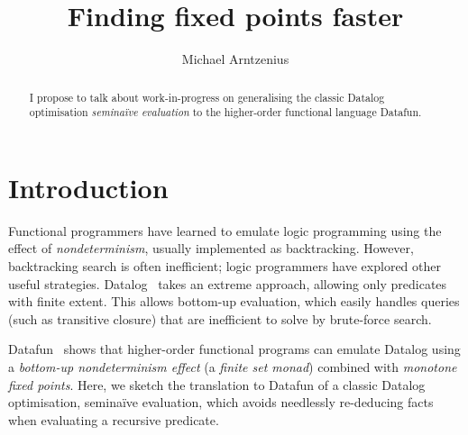 \documentclass[sigplan,screen,review,timestamp,dvipsnames]{acmart}
\title{Finding fixed points faster}
\author{Michael Arntzenius}
\affiliation{University of Birmingham}
\newcommand{\naive}{na\"ive}
\begin{document}

\begin{abstract}
  I propose to talk about work-in-progress on generalising the classic Datalog
  optimisation \emph{semi\naive{} evaluation} to the higher-order functional
  language Datafun.
\end{abstract}

\maketitle

\section{Introduction}



Functional programmers have learned to emulate logic programming using the
effect of \emph{nondeterminism}, usually implemented as backtracking. However,
backtracking search is often inefficient; logic programmers have explored other
useful strategies.
%
Datalog~\citep{datalog} takes an extreme approach, allowing only predicates with
finite extent. This allows bottom-up evaluation, which easily handles queries
(such as transitive closure) that are inefficient to solve by brute-force
search.

Datafun~\cite{datafun} shows that higher-order functional programs can emulate
Datalog using a \emph{bottom-up nondeterminism effect} (a \emph{finite set
  monad}) combined with \emph{monotone fixed points}. Here, we sketch the
translation to Datafun of a classic Datalog optimisation, semi\naive{}
evaluation, which avoids needlessly re-deducing facts when evaluating a
recursive predicate.
\end{document}
